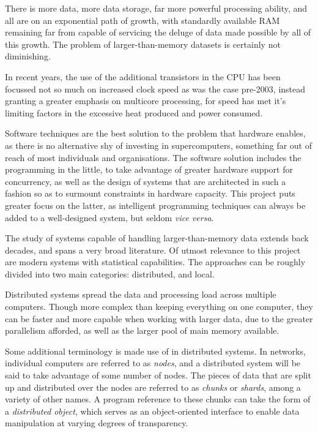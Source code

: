 There is more data, more data storage, far more powerful processing ability, and all are on an exponential path of growth, with standardly available RAM remaining far from capable of servicing the deluge of data made possible by all of this growth\cite{sutter2005free}.
The problem of larger-than-memory datasets is certainly not diminishing.

In recent years, the use of the additional transistors in the CPU has been focussed not so much on increased clock speed as was the case pre-2003, instead granting a greater emphasis on multicore processing, for speed has met it's limiting factors in the excessive heat produced and power consumed\cite{sutter2005free}.

Software techniques are the best solution to the problem that hardware enables, as there is no alternative shy of investing in supercomputers, something far out of reach of most individuals and organisations.
The software solution includes the programming in the little, to take advantage of greater hardware support for concurrency, as well as the design of systems that are architected in such a fashion so as to surmount constraints in hardware capacity.
This project puts greater focus on the latter, as intelligent programming techniques can always be added to a well-designed system, but seldom \textit{vice versa}.

The study of systems capable of handling larger-than-memory data extends back decades, and spans a very broad literature.
Of utmost relevance to this project are modern systems with statistical capabilities.
The approaches can be roughly divided into two main categories: distributed, and local.

Distributed systems spread the data and processing load across multiple computers.
Though more complex than keeping everything on one computer, they can be faster and more capable when working with larger data, due to the greater parallelism afforded, as well as the larger pool of main memory available\cite{foster1995parallel}.

Some additional terminology is made use of in distributed systems.
In networks, individual computers are referred to as \textit{nodes}, and a distributed system will be said to take advantage of some number of nodes\cite{kleppmann2017dataintensive}.
The pieces of data that are split up and distributed over the nodes are referred to as \textit{chunks} or \textit{shards}, among a variety of other names.
A program reference to these chunks can take the form of a \textit{distributed object}, which serves as an object-oriented interface to enable data manipulation at varying degrees of transparency\cite{emmerich2000engineering}.\\

